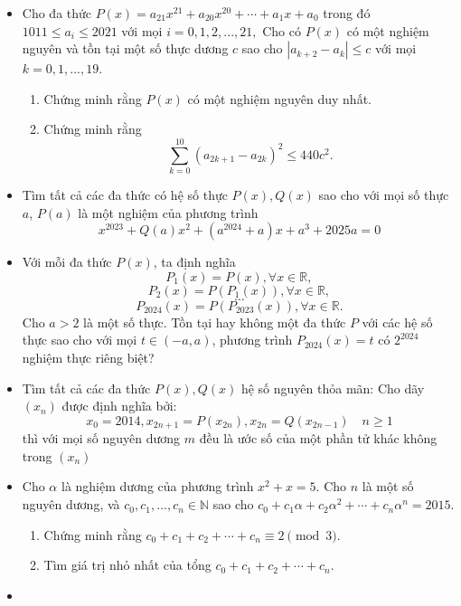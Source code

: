 \documentclass[11pt]{scrartcl}
\begin{document}
\begin{itemize}[label=, leftmargin=0em, itemsep=-0em]
        \item \begin{btvn}
            Cho đa thức $P(x)=a_{21}x^{21}+a_{20}x^{20}+\cdots +a_1x+a_0$ trong đó $1011\leq a_i\leq 2021$ với mọi $i=0,1,2,...,21,$ Cho có $P(x)$ có một nghiệm nguyên và tồn tại một số thực dương $c$ sao cho $|a_{k+2}-a_k|\leq c$ với mọi $k=0,1,...,19.$
            \begin{enumerate}[label=(\alph*)]
                \item Chứng minh rằng $P(x)$ có một nghiệm nguyên duy nhất.
                \item Chứng minh rằng$$\sum_{k=0}^{10}(a_{2k+1}-a_{2k})^2\leq 440c^2.$$
            \end{enumerate}
        \end{btvn}
        \item \begin{btvn}
            Tìm tất cả các đa thức có hệ số thực $P(x), Q(x)$ sao cho với mọi số thực $a$, $P(a)$ là một nghiệm của phương trình $$x^{2023}+Q(a)x^2+(a^{2024}+a)x+a^3+2025a=0$$
        \end{btvn}
        \item \begin{btvn}
            Với mỗi đa thức $P(x)$, ta định nghĩa 
            $$P_1(x)=P(x), \forall x \in \mathbb{R},$$$$P_2(x)=P(P_1(x)),  \forall x \in \mathbb{R},$$$$...$$$$P_{2024}(x)=P(P_{2023}(x)), \forall x \in \mathbb{R}.$$
            Cho $a>2$ là một số thực. Tồn tại hay không một đa thức $P$ với các hệ số thực sao cho với mọi $t \in (-a, a)$, phương trình $P_{2024}(x)=t$ có $2^{2024}$ nghiệm thực riêng biệt?
        \end{btvn}
        \item \begin{btvn}
            Tìm tất cả các đa thức $P(x),Q(x)$ hệ số nguyên thỏa mãn: Cho dãy $(x_n)$ được định nghĩa bởi:
            \[x_0=2014,x_{2n+1}=P(x_{2n}),x_{2n}=Q(x_{2n-1}) \quad n\geq 1\]
            thì với mọi số nguyên dương $m$ đều là ước số của một phần tử khác không trong $(x_n )$
        \end{btvn}
        \item \begin{btvn}
            Cho $\alpha$ là nghiệm dương của phương trình $x^2+x=5$. Cho $n$ là một số nguyên dương, và $c_0,c_1,\ldots,c_n\in \mathbb{N}$ sao cho $ c_0+c_1\alpha+c_2\alpha^2+\cdots+c_n\alpha^n=2015. $
            \begin{enumerate}[label=(\alph*)]
                \item Chứng minh rằng $c_0+c_1+c_2+\cdots+c_n\equiv 2 \pmod{3}$.
                \item Tìm giá trị nhỏ nhất của tổng $c_0+c_1+c_2+\cdots+c_n$.
            \end{enumerate}
        \end{btvn}
        \item \begin{btvn}
            

\end{btvn}
\end{itemize}
\end{document}
